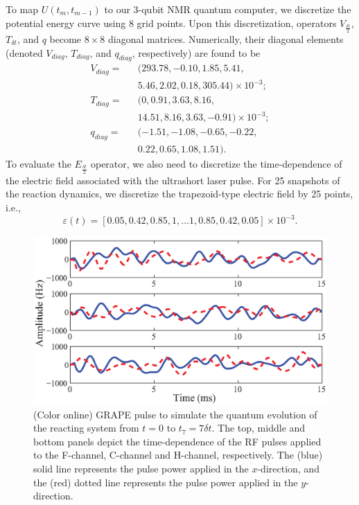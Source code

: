 \documentclass[twocolumn,showpacs,twoside,10pt,prl]{revtex4}
\begin{document}
To map $U(t_m,t_{m-1})$ to our 3-qubit NMR quantum computer, we discretize the potential energy curve using 8 grid points. Upon this discretization,
operators $V_{\frac{\delta t}{2}}$, $T_{\delta t}$, and $q$ become $8\times 8$ diagonal matrices. Numerically,  their diagonal elements  (denoted
$V_{diag}$, $T_{diag}$, and $q_{diag}$, respectively) are found to be
\begin{eqnarray}\label{operator}
  {V}_{diag} =&&(293.78,-0.10,1.85,5.41,\nonumber\\
             &&  5.46,2.02,0.18,305.44)\times 10^{-3};\nonumber\\
  {T}_{diag} =&&(0,0.91,3.63,8.16,\nonumber\\
&&  14.51,8.16,3.63,-0.91)\times 10^{-3};\nonumber\\
  {q}_{diag} =&&(-1.51,-1.08,-0.65,-0.22,\nonumber\\
&&  0.22,0.65,1.08,1.51).
\end{eqnarray}
To evaluate the $E_{\frac{\delta t}{2}}$ operator, we also need to discretize the time-dependence of the electric field associated with the ultrashort laser pulse.  For 25 snapshots of the reaction dynamics, we discretize the trapezoid-type electric field by 25 points, i.e., \begin{equation}\label{varepsilon}
\varepsilon(t)=[0.05,0.42,0.85,1,...1,0.85,0.42,0.05] \times 10^{-3}.
\end{equation}

\begin{figure}[h]
\includegraphics[width= 0.95\columnwidth]{grape.eps}
\caption{\footnotesize{(Color online) GRAPE pulse to simulate the quantum evolution of the reacting system from $t=0$ to $t_7=7\delta t$.
The top, middle and bottom panels depict the time-dependence of the RF pulses applied to the F-channel, C-channel and H-channel, respectively.
The (blue) solid line represents the pulse power applied in the ${x}$-direction, and the (red) dotted line represents the pulse power applied in the ${y}$-direction.}}
\label{grape}
\end{figure}
\end{document}
